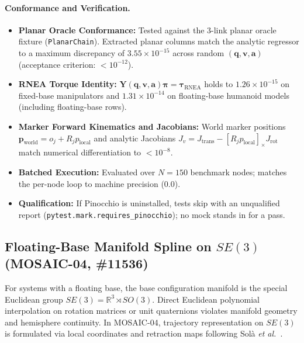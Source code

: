\documentclass[11pt,a4paper]{article}
\newcommand{\bq}{\mathbf{q}}
\newcommand{\bv}{\mathbf{v}}
\newcommand{\ba}{\mathbf{a}}
\newcommand{\bY}{\mathbf{Y}}
\newcommand{\bpi}{\boldsymbol{\pi}}
\newcommand{\btau}{\boldsymbol{\tau}}
\newcommand{\bp}{\mathbf{p}}
\begin{document}
\paragraph{Conformance and Verification.}
\begin{itemize}[nosep]
  \item \textbf{Planar Oracle Conformance:} Tested against the 3-link planar oracle
    fixture (\texttt{PlanarChain}).  Extracted planar columns match the analytic
    regressor to a maximum discrepancy of $3.55 \times 10^{-15}$ across random
    $(\bq, \bv, \ba)$ (acceptance criterion: $< 10^{-12}$).
  \item \textbf{RNEA Torque Identity:} $\bY(\bq, \bv, \ba)\bpi = \btau_{\text{RNEA}}$ holds
    to $1.26 \times 10^{-15}$ on fixed-base manipulators and $1.31 \times 10^{-14}$ on
    floating-base humanoid models (including floating-base rows).
  \item \textbf{Marker Forward Kinematics and Jacobians:} World marker positions $\bp_{\text{world}} = o_j + R_j p_{\text{local}}$
    and analytic Jacobians $J_v = J_{\text{trans}} - [R_j p_{\text{local}}]_\times J_{\text{rot}}$
    match numerical differentiation to $< 10^{-8}$.
  \item \textbf{Batched Execution:} Evaluated over $N=150$ benchmark nodes; matches the
    per-node loop to machine precision ($0.0$).
  \item \textbf{Qualification:} If Pinocchio is uninstalled, tests skip with an
    unqualified report (\texttt{pytest.mark.requires\_pinocchio}); no mock stands in for a pass.
\end{itemize}

\subsection{Floating-Base Manifold Spline on $SE(3)$ (MOSAIC-04, \#11536)}
\label{sec:manifold_spline}
For systems with a floating base, the base configuration manifold is the special Euclidean group $SE(3)=\mathbb{R}^3\rtimes SO(3)$. Direct Euclidean polynomial interpolation on rotation matrices or unit quaternions violates manifold geometry and hemisphere continuity. In MOSAIC-04, trajectory representation on $SE(3)$ is formulated via local coordinates and retraction maps following Sol\`a \emph{et al.}~\cite{Sola2018}.
\end{document}
